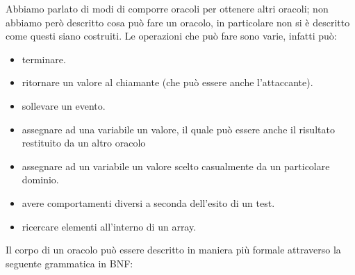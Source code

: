 \documentclass[a4paper,openright,twoside,12pt]{report}
\begin{document}
Abbiamo parlato di modi di comporre oracoli per ottenere altri oracoli; non abbiamo per\`o descritto cosa pu\`o fare un oracolo, in particolare non si \`e 
descritto come questi siano costruiti.
Le operazioni che pu\`o fare sono varie, infatti pu\`o:
\begin{itemize}
 \item terminare.
 \item ritornare un valore al chiamante (che pu\`o essere anche l'attaccante).
 \item sollevare un evento.
 \item assegnare ad una variabile un valore, il quale pu\`o essere anche il risultato restituito da un altro oracolo
 \item assegnare ad un variabile un valore scelto casualmente da un particolare dominio.
 \item avere comportamenti diversi a seconda dell'esito di un test.
 \item ricercare elementi all'interno di un array.
\end{itemize}
Il corpo di un oracolo pu\`o essere descritto in maniera pi\`u formale attraverso la seguente grammatica in BNF:
\end{document}
